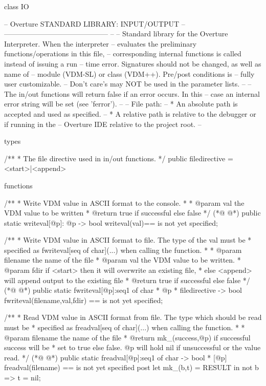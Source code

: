 \begin{vdmpp}[breaklines=true]
class IO

--  Overture STANDARD LIBRARY: INPUT/OUTPUT
--      --------------------------------------------
-- 
-- Standard library for the Overture Interpreter. When the interpreter
-- evaluates the preliminary functions/operations in this file,
-- corresponding internal functions is called instead of issuing a run
-- time error. Signatures should not be changed, as well as name of
-- module (VDM-SL) or class (VDM++). Pre/post conditions is 
-- fully user customizable. 
-- Don't care's may NOT be used in the parameter lists.
--
-- The in/out functions  will return false if an error occurs. In this
-- case an internal error string will be set (see 'ferror').
--
-- File path:
--  * An absolute path is accepted and used as specified.
--  * A relative path is relative to the debugger or if running in the 
--      Overture IDE relative to the project root.
--

types
 
/**
 * The file directive used in in/out functions.
 */
public filedirective = <start>|<append> 

functions

/**
 * Write VDM value in ASCII format to the console.
 *
 * @param val the VDM value to be written
 * @return true if successful else false
 */
(*@
\label{writeval:38}
@*)
public static writeval[@p]: @p -> bool
writeval(val)==
  is not yet specified;

/**
 * Write VDM value in ASCII format to file. The type of the val must be
 * specified as fwriteval[seq of char](...) when calling the function.
 *
 * @param filename the name of the file
 * @param val the VDM value to be written.
 * @param fdir if <start> then it will overwrite an existing file, 
 *  else <append> will append output to the existing file
 * @return true if successful else false
 */
(*@
\label{fwriteval:52}
@*)
public static fwriteval[@p]:seq1 of char * @p * filedirective -> bool
fwriteval(filename,val,fdir) ==
  is not yet specified;

/**
 * Read VDM value in ASCII format from file. The type which should be read must be
 * specified as freadval[seq of char](...) when calling the function.
 *
 * @param filename the name of the file
 * @return mk_(success,@p) if successful success will be 
 * set to true else false. @p will hold nil if unsuccessful or the value read.
 */
(*@
\label{freadval:64}
@*)
public static freadval[@p]:seq1 of char -> bool * [@p]
freadval(filename) ==
  is not yet specified
  post let mk_(b,t) = RESULT in not b => t = nil;


\end{vdmpp}
